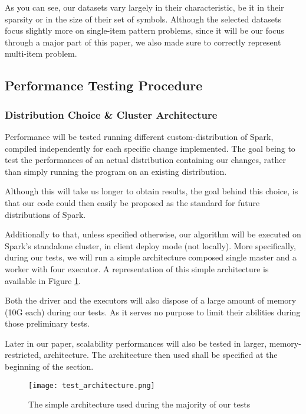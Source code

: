 \documentclass{eplmastersthesis}
\begin{document}
As you can see, our datasets vary largely in their characteristic, be it in their sparsity or in the size of their set of symbols. Although the selected datasets focus slightly more on single-item pattern problems, since it will be our focus through a major part of this paper, we also made sure to correctly represent multi-item problem.

\subsection{Performance Testing Procedure}

\subsubsection{Distribution Choice \& Cluster Architecture}

Performance will be tested running different custom-distribution of Spark, compiled independently for each specific change implemented. The goal being to test the performances of an actual distribution containing our changes, rather than simply running the program on an existing distribution. \newline

Although this will take us longer to obtain results, the goal behind this choice, is that our code could then easily be proposed as the standard for future distributions of Spark.  \newline

Additionally to that, unless specified otherwise, our algorithm will be executed on Spark's standalone cluster, in client deploy mode (not locally). More specifically, during our tests, we will run a simple architecture composed single master and a worker with four executor. A representation of this simple architecture is available in Figure \ref{fig:test_architecture}.\newline

Both the driver and the executors will also dispose of a large amount of memory (10G each) during our tests. As it serves no purpose to limit their abilities during those preliminary tests. \newline

Later in our paper, scalability performances will also be tested in larger, memory-restricted, architecture. The architecture then used shall be specified at the beginning of the section.

\begin{figure}[h]
  \centering
  \texttt{[image: test\_architecture.png]}
  \caption{The simple architecture used during the majority of our tests}
  \label{fig:test_architecture}
\end{figure}
\end{document}
